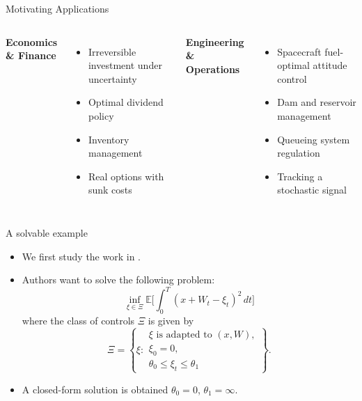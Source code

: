 \documentclass[11pt, aspectratio=169]{beamer}
\theoremstyle{plain}
\begin{document}
\begin{frame}{Motivating Applications}
  \begin{columns}[T]
    \textbf{Economics \& Finance}
    \begin{itemize}
      \item Irreversible investment under uncertainty
      \item Optimal dividend policy
      \item Inventory management
      \item Real options with sunk costs
    \end{itemize}

    \textbf{Engineering \& Operations}
    \begin{itemize}
      \item Spacecraft fuel-optimal attitude control
      \item Dam and reservoir management
      \item Queueing system regulation
      \item Tracking a stochastic signal
    \end{itemize}
  \end{columns}
\end{frame}

\begin{frame}{A solvable example}
\begin{itemize}
\item We first study the work in \cite{BSW1980}.
\item Authors want to solve the following problem:
\begin{equation*}
\inf_{\xi \in \Xi} \mathbb{E} \Bigg[ \int_0^T (x + W_t - \xi_t)^2 \, dt \Bigg]
\end{equation*}
where the class of controls $\Xi$ is given by
\begin{equation*}
\Xi = \left\{ \xi : 
\begin{array}{l}
\xi \text{ is adapted to } (x,W), \\
\xi_0 = 0, \\
\theta_0 \le \xi_t \le \theta_1
\end{array}
\right\}.
\end{equation*}
\item A closed-form solution is obtained $\theta_0=0$, $\theta_1=\infty$.
\end{itemize}
\end{frame}
\end{document}
